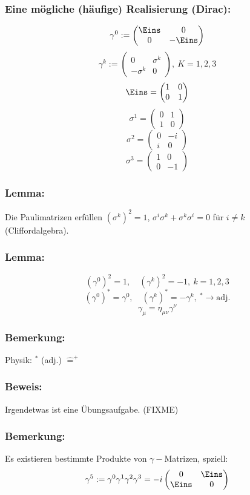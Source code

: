 \documentclass[twoside,a4paper]{scrartcl}
\renewcommand{\1}{\mathds{1}}
\newcommand{\ra}{\rightarrow}
\newcommand{\entspricht}{\mathrel{\widehat{=}}}
\begin{document}
\subsubsection*{Eine mögliche (häufige) Realisierung (Dirac):}
$$\gamma^0:=\begin{pmatrix} \Eins & 0 \\ 0 & -\Eins \end{pmatrix}$$
$$\gamma^k:=\begin{pmatrix} 0 & \sigma^k \\ -\sigma^k & 0 \end{pmatrix}, \ K=1,2,3$$
$$\Eins=\begin{pmatrix} 1 & 0 \\ 0 & 1 \end{pmatrix}$$
$$\sigma^1=\begin{pmatrix} 0 & 1 \\ 1 & 0 \end{pmatrix}$$
$$\sigma^2=\begin{pmatrix} 0 & -i \\ i & 0 \end{pmatrix}$$
$$\sigma^3=\begin{pmatrix} 1 & 0 \\ 0 & -1 \end{pmatrix}$$
\subsubsection*{Lemma:}
Die Paulimatrizen erfüllen $(\sigma^k)^2=1$, $\sigma^i\sigma^k+\sigma^k\sigma^i=0$ für $i\neq k$ (Cliffordalgebra).

\subsubsection*{Lemma:}
$$(\gamma^0)^2=1, \quad (\gamma^k)^2=-1, \ k=1,2,3$$
$$(\gamma^0)^*=\gamma^0, \quad (\gamma^k)^*=-\gamma^k, \ ^*\ra \mathrm{adj.}$$
$$\gamma_\mu=\eta_{\mu\nu} \gamma^\nu$$
\subsubsection*{Bemerkung:}
Physik: $^*$ (adj.) $\entspricht ^+$
\subsubsection*{Beweis:}
Irgendetwas ist eine Übungsaufgabe. (FIXME)
\subsubsection*{Bemerkung:}
Es existieren bestimmte Produkte von $\gamma-$Matrizen, spziell:
$$\gamma^5:=\gamma^0\gamma^1\gamma^2\gamma^3=-i \begin{pmatrix} 0 & \Eins \\ \Eins & 0 \end{pmatrix}$$
\end{document}
